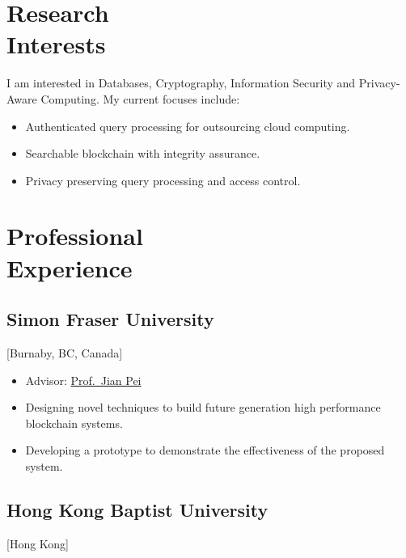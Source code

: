 \documentclass{mycv}
\begin{document}
\maketitle

\section{Research \\ Interests}

I am interested in Databases, Cryptography, Information Security and Privacy-Aware Computing. My current focuses include:

\begin{itemize}
  \item Authenticated query processing for outsourcing cloud computing.
  \item Searchable blockchain with integrity assurance.
  \item Privacy preserving query processing and access control.
\end{itemize}

\section{Professional \\ Experience}

\subsection{Simon Fraser University}[Burnaby, BC, Canada]
\begin{positions}
\end{positions}

\begin{itemize}
  \item Advisor: \href{https://www.cs.sfu.ca/~jpei/}{Prof.~Jian Pei}
  \item Designing novel techniques to build future generation high performance blockchain systems.
  \item Developing a prototype to demonstrate the effectiveness of the proposed system.
\end{itemize}

\subsection{Hong Kong Baptist University}[Hong Kong]
\begin{positions}
\end{positions}
\end{document}
